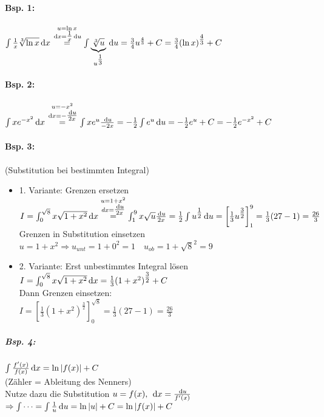 \paragraph{Bsp. 1:} $\int \frac{1}{x}\sqrt[3]{\ln x}\,\mathrm{d}x\overset{\substack{u=\ln x\\\,\mathrm{d}x=\tfrac{1}{x}\,\mathrm{d}u}}{=}\int \underbrace{\sqrt[3]{u}}_{u^{\tfrac{1}{3}}}\,\mathrm{d}u=\frac{3}{4}u^{\frac{4}{3}}+C=\frac{3}{4}(\ln x)^{\tfrac{4}{3}}+C$
\paragraph{Bsp. 2:}$\int x e^{-x^2}\,\mathrm{d}x\overset{\substack{u=-x^2\\\,\mathrm{d}x=-\tfrac{\,\mathrm{d}u}{2x}}}{=}\int x e^u\frac{\,\mathrm{d}u}{-2x}=-\frac{1}{2}\int e^u \,\mathrm{d}u=-\frac{1}{2}e^u+C=-\frac{1}{2}e^{-x^2}+C$
\paragraph{Bsp. 3:} (Substitution bei bestimmten Integral)
\begin{itemize}
\item 1. Variante: Grenzen ersetzen\\
$I=\int_0^{\sqrt{8}}x\sqrt{1+x^2}\,\mathrm{d}x\overset{\substack{u=1+x^2\\dx=\tfrac{\,\mathrm{d}u}{2x}}}{=}\int_1^9 x \sqrt{u} \frac{\,\mathrm{d}u}{2x}=\frac{1}{2}\int u^{\tfrac{1}{2}}\,\mathrm{d}u= \left[\frac{1}{3}u^{\tfrac{3}{2}}\right]_1^9=\frac{1}{3}(27-1)=\frac{26}{3}$\\
Grenzen in Substitution einsetzen $u=1+x^2\Rightarrow u_{unt}=1+0^2=1 \quad u_{ob}=1+\sqrt{8}^2=9$
\item 2. Variante: Erst unbestimmtes Integral  lösen\\
$I=\int_0^{\sqrt{8}}x\sqrt{1+x^2}\,\mathrm{d}x=\frac{1}{3}(1+x^2)^{\tfrac{3}{2}}+C$\\
Dann Grenzen einsetzen:\\
$I=\left[\frac{1}{3}(1+x^2)^{\tfrac{3}{2}}\right]_0^{\sqrt{8}}=\frac{1}{3}(27-1)=\frac{26}{3}$
\end{itemize}
\subparagraph{Bsp. 4:} $\int \frac{f'(x)}{f(x)}\,\mathrm{d}x=\ln |f(x)|+C$\\
(Zähler = Ableitung des Nenners)\\
Nutze dazu die Substitution $u=f(x), \; \,\mathrm{d}x=\frac{\,\mathrm{d}u}{f'(x)}$\\
$\Rightarrow \int \dots = \int \frac{1}{u} \,\mathrm{d}u=\ln | u| + C = \ln | f(x) | + C$

